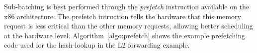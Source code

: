 %


Sub-batching is best performed through the {\em prefetch} instruction available
on the x86 architecture. The prefetch intruction tells the hardware that this memory request is less
critical than the other memory requests, allowing better scheduling at the hardware level. Algorithm~\ref{algo:prefetch}
shows the example prefetching code used for the hash-lookup in the L2 forwarding example.

